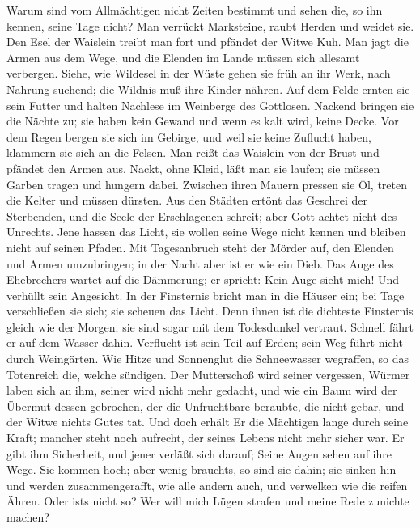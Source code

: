  Warum sind vom Allmächtigen nicht Zeiten bestimmt und
sehen die, so ihn kennen, seine Tage nicht?  Man verrückt
Marksteine, raubt Herden und weidet sie.  Den Esel der
Waislein treibt man fort und pfändet der Witwe Kuh.  Man
jagt die Armen aus dem Wege, und die Elenden im Lande müssen sich
allesamt verbergen.  Siehe, wie Wildesel in der Wüste
gehen sie früh an ihr Werk, nach Nahrung suchend; die Wildnis muß ihre
Kinder nähren.  Auf dem Felde ernten sie sein Futter und
halten Nachlese im Weinberge des Gottlosen.  Nackend
bringen sie die Nächte zu; sie haben kein Gewand und wenn es kalt wird,
keine Decke.  Vor dem Regen bergen sie sich im Gebirge,
und weil sie keine Zuflucht haben, klammern sie sich an die Felsen.
 Man reißt das Waislein von der Brust und pfändet den
Armen aus.  Nackt, ohne Kleid, läßt man sie laufen; sie
müssen Garben tragen und hungern dabei.  Zwischen ihren
Mauern pressen sie Öl, treten die Kelter und müssen dürsten.
 Aus den Städten ertönt das Geschrei der Sterbenden, und
die Seele der Erschlagenen schreit; aber Gott achtet nicht des Unrechts.
 Jene hassen das Licht, sie wollen seine Wege nicht
kennen und bleiben nicht auf seinen Pfaden.  Mit
Tagesanbruch steht der Mörder auf, den Elenden und Armen umzubringen; in
der Nacht aber ist er wie ein Dieb.  Das Auge des
Ehebrechers wartet auf die Dämmerung; er spricht: Kein Auge sieht mich!
Und verhüllt sein Angesicht.  In der Finsternis bricht
man in die Häuser ein; bei Tage verschließen sie sich; sie scheuen das
Licht.  Denn ihnen ist die dichteste Finsternis gleich
wie der Morgen; sie sind sogar mit dem Todesdunkel vertraut.
 Schnell fährt er auf dem Wasser dahin. Verflucht ist
sein Teil auf Erden; sein Weg führt nicht durch Weingärten.
 Wie Hitze und Sonnenglut die Schneewasser wegraffen, so
das Totenreich die, welche sündigen.  Der Mutterschoß
wird seiner vergessen, Würmer laben sich an ihm, seiner wird nicht mehr
gedacht, und wie ein Baum wird der Übermut dessen gebrochen,
 der die Unfruchtbare beraubte, die nicht gebar, und der
Witwe nichts Gutes tat.  Und doch erhält Er die Mächtigen
lange durch seine Kraft; mancher steht noch aufrecht, der seines Lebens
nicht mehr sicher war.  Er gibt ihm Sicherheit, und jener
verläßt sich darauf;  Seine Augen sehen auf ihre Wege.
Sie kommen hoch; aber wenig braucht\textquotesingle s, so sind sie
dahin; sie sinken hin und werden zusammengerafft, wie alle andern auch,
und verwelken wie die reifen Ähren.  Oder
ist\textquotesingle s nicht so? Wer will mich Lügen strafen und meine
Rede zunichte machen?

